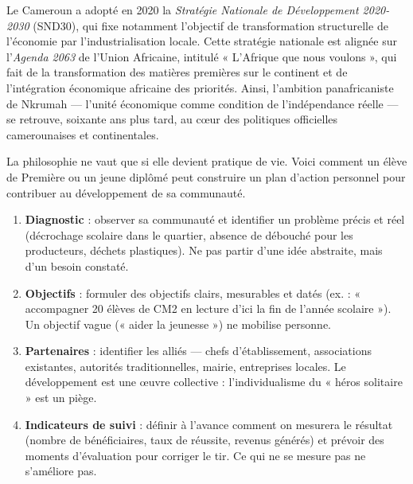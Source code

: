 \documentclass[11pt]{article}
\newcounter{popsec}
\newcounter{popsub}
\newcommand{\courssub}[1]{%
  \stepcounter{popsub}%
  \par\vspace{9pt}\noindent{\popxbold\fontsize{11.5}{13}\selectfont\color{popink}{\color{poporange}\thepopsec.\thepopsub}\hspace{6pt}#1}\par\nopagebreak\vspace{4pt}
}
\begin{document}
\begin{savaistu}
Le Cameroun a adopté en 2020 la \emph{Stratégie Nationale de Développement 2020-2030} (SND30), qui fixe notamment l'objectif de transformation structurelle de l'économie par l'industrialisation locale. Cette stratégie nationale est alignée sur l'\emph{Agenda 2063} de l'Union Africaine, intitulé « L'Afrique que nous voulons », qui fait de la transformation des matières premières sur le continent et de l'intégration économique africaine des priorités. Ainsi, l'ambition panafricaniste de Nkrumah — l'unité économique comme condition de l'indépendance réelle — se retrouve, soixante ans plus tard, au cœur des politiques officielles camerounaises et continentales.
\end{savaistu}

\courssub{Élaborer un plan d'action personnel}

La philosophie ne vaut que si elle devient pratique de vie. Voici comment un élève de Première ou un jeune diplômé peut construire un plan d'action personnel pour contribuer au développement de sa communauté.

\begin{methode}
\begin{enumerate}
\item \textbf{Diagnostic} : observer sa communauté et identifier un problème précis et réel (décrochage scolaire dans le quartier, absence de débouché pour les producteurs, déchets plastiques). Ne pas partir d'une idée abstraite, mais d'un besoin constaté.
\item \textbf{Objectifs} : formuler des objectifs clairs, mesurables et datés (ex. : « accompagner 20 élèves de CM2 en lecture d'ici la fin de l'année scolaire »). Un objectif vague (« aider la jeunesse ») ne mobilise personne.
\item \textbf{Partenaires} : identifier les alliés — chefs d'établissement, associations existantes, autorités traditionnelles, mairie, entreprises locales. Le développement est une œuvre collective : l'individualisme du « héros solitaire » est un piège.
\item \textbf{Indicateurs de suivi} : définir à l'avance comment on mesurera le résultat (nombre de bénéficiaires, taux de réussite, revenus générés) et prévoir des moments d'évaluation pour corriger le tir. Ce qui ne se mesure pas ne s'améliore pas.
\end{enumerate}
\end{methode}
\end{document}
